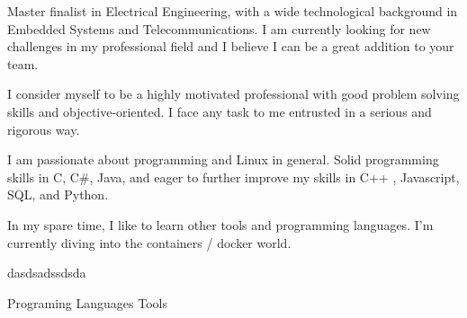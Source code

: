 \documentclass[11pt, a4paper]{cv}
\begin{document}



\aboutme
{

	\faQuoteLeft \space Master finalist in Electrical Engineering, with a wide technological background in Embedded Systems and Telecommunications. I am currently looking for new challenges in my professional field and I believe I can be a great addition to your team.

	I consider myself to be a highly motivated professional with good problem solving skills and objective-oriented. I face any task to me entrusted in a serious and rigorous way.

	I am passionate about programming and Linux in general. Solid programming skills in C, C\#, Java, and eager to further improve my skills in C++ , Javascript, SQL, and Python. 

	In my spare time, I like to learn other tools and programming languages. I'm currently diving into the containers / docker world. \faQuoteRight

}


dasdsadssdsda


\begin{multicols}{2}
	Programing Languages \newline
	Tools
\end{multicols}
\end{document}
